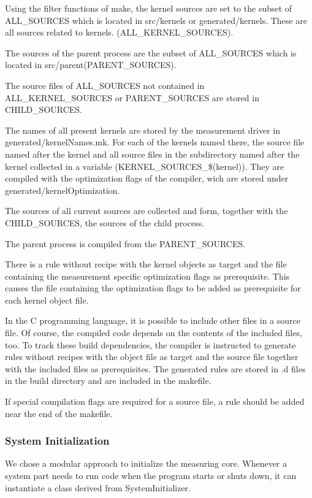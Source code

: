 \documentclass[a4paper,12pt]{article}
\begin{document}
Using the filter functions of make, the kernel sources are set to the subset of
ALL\_SOURCES which is located in src/kernels or generated/kernels. These are all sources related to kernels.
(ALL\_KERNEL\_SOURCES).

The sources of the parent process are the subset of ALL\_SOURCES which is
located in src/parent(PARENT\_SOURCES).

The source files of ALL\_SOURCES not contained in ALL\_KERNEL\_SOURCES or
PARENT\_SOURCES are stored in CHILD\_SOURCES.

The names of all present kernels are stored by the measurement driver in
generated/kernelNames.mk. For each of the kernels named there, the source file
named after the kernel and all source files in the subdirectory named after the
kernel collected in a variable (KERNEL\_SOURCES\_\$(kernel)). They are compiled
with the optimization flags of the compiler, wich are stored under
generated/kernelOptimization.

The sources of all current sources are collected and form, together with the
CHILD\_SOURCES, the sources of the child process.

The parent process is compiled from the PARENT\_SOURCES.

There is a rule without recipe with the kernel objects as target and the file
containing the measurement specific optimization flags as prerequisite. This
causes the file containing the optimization flags to be added as prerequisite
for each kernel object file.

In the C programming language, it is possible to include other files in a source
file. Of course, the compiled code depends on the contents of the included
files, too. To track these build dependencies, the compiler is instructed to
generate rules without recipes with the object file as target and the source
file together with the included files as prerequisites. The generated rules are
stored in .d files in the build directory and are included in the makefile.

If special compilation flags are required for a source file, a rule should be
added near the end of the makefile.

\subsubsection{System Initialization}
We chose a modular approach to initialize the measuring core. Whenever a system
part needs to run code when the program starts or shuts down, it can instantiate
a class derived from SystemInitializer.
\end{document}
